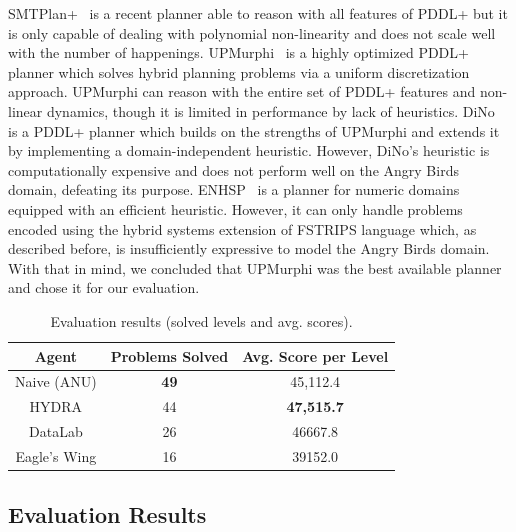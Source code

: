 SMTPlan+~\cite{cashmore2016compilation} is a recent planner able to reason with all features of PDDL+ but it is only capable of dealing with polynomial non-linearity and does not scale well with the number of happenings. UPMurphi~\cite{della2009upmurphi} is a highly optimized PDDL+ planner which solves hybrid planning problems via a uniform discretization approach. UPMurphi can reason with the entire set of PDDL+ features and non-linear dynamics, though it is limited in performance by lack of heuristics. DiNo~\cite{piotrowski2016heuristic} is a PDDL+ planner which builds on the strengths of UPMurphi and extends it by implementing a domain-independent heuristic. However, DiNo's heuristic is computationally expensive and does not perform well on the Angry Birds domain, defeating its purpose. ENHSP~\cite{scala2016interval} is a planner for numeric domains equipped with an efficient heuristic. However, it can only handle problems encoded using the hybrid systems extension of FSTRIPS language which, as described before, is insufficiently expressive to model the Angry Birds domain. With that in mind, we concluded that UPMurphi was the best available planner and chose it for our evaluation.


\begin{table}[ht!]
\centering
\small
\begin{tabular}{|c|c|c|}
\hline
\textbf{Agent} & \textbf{Problems Solved} & \textbf{Avg. Score per Level} \\ \hline
Naive (ANU)    & \textbf{49}              & 45,112.4                      \\ \hline
HYDRA          & 44                       & \textbf{47,515.7}             \\ \hline
DataLab        & 26                       & 46667.8                      \\ \hline
Eagle's  Wing  & 16                       & 39152.0                      \\ \hline
\end{tabular}
\caption{Evaluation results (solved levels and avg. scores).}
\label{tab:results}
\end{table}

\subsection{Evaluation Results}

